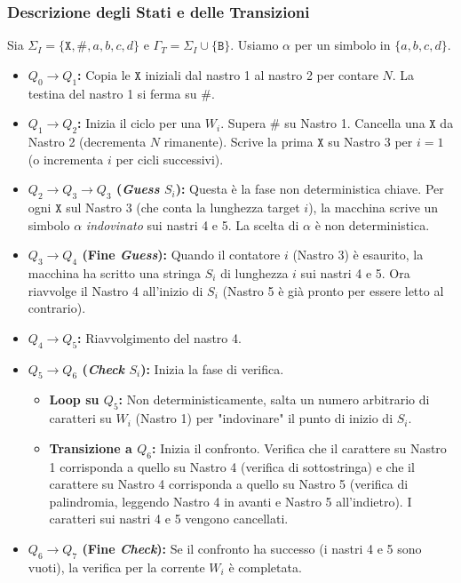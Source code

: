 \documentclass[a4paper]{article}
\newcommand{\B}{\texttt{B}} %
\newcommand{\Sh}{\texttt{\#}} %
\newcommand{\X}{\texttt{X}} %
\newcommand{\alphaSym}{\alpha} %
\begin{document}
\subsubsection{Descrizione degli Stati e delle Transizioni}
Sia $\Sigma_I = \{\X, \Sh, a,b,c,d\}$ e $\Gamma_T = \Sigma_I \cup \{\B\}$. Usiamo $\alphaSym$ per un simbolo in $\{a,b,c,d\}$.
\begin{itemize}
    \item \textbf{$Q_0 \to Q_1$:} Copia le $\X$ iniziali dal nastro 1 al nastro 2 per contare $N$. La testina del nastro 1 si ferma su $\Sh$.
    \item \textbf{$Q_1 \to Q_2$:} Inizia il ciclo per una $W_i$. Supera $\Sh$ su Nastro 1. Cancella una $\X$ da Nastro 2 (decrementa $N$ rimanente). Scrive la prima $\X$ su Nastro 3 per $i=1$ (o incrementa $i$ per cicli successivi).
    \item \textbf{$Q_2 \to Q_3 \to Q_3$ (\textit{Guess} $S_i$):} Questa è la fase non deterministica chiave. Per ogni $\X$ sul Nastro 3 (che conta la lunghezza target $i$), la macchina scrive un simbolo $\alphaSym$ \textit{indovinato} sui nastri 4 e 5. La scelta di $\alphaSym$ è non deterministica.
    \item \textbf{$Q_3 \to Q_4$ (Fine \textit{Guess}):} Quando il contatore $i$ (Nastro 3) è esaurito, la macchina ha scritto una stringa $S_i$ di lunghezza $i$ sui nastri 4 e 5. Ora riavvolge il Nastro 4 all'inizio di $S_i$ (Nastro 5 è già pronto per essere letto al contrario).
    \item \textbf{$Q_4 \to Q_5$:} Riavvolgimento del nastro 4.
    \item \textbf{$Q_5 \to Q_6$ (\textit{Check} $S_i$):} Inizia la fase di verifica.
        \begin{itemize}
            \item \textbf{Loop su $Q_5$:} Non deterministicamente, salta un numero arbitrario di caratteri su $W_i$ (Nastro 1) per "indovinare" il punto di inizio di $S_i$.
            \item \textbf{Transizione a $Q_6$:} Inizia il confronto. Verifica che il carattere su Nastro 1 corrisponda a quello su Nastro 4 (verifica di sottostringa) e che il carattere su Nastro 4 corrisponda a quello su Nastro 5 (verifica di palindromia, leggendo Nastro 4 in avanti e Nastro 5 all'indietro). I caratteri sui nastri 4 e 5 vengono cancellati.
        \end{itemize}
    \item \textbf{$Q_6 \to Q_7$ (Fine \textit{Check}):} Se il confronto ha successo (i nastri 4 e 5 sono vuoti), la verifica per la corrente $W_i$ è completata.

\end{itemize}
\end{document}
